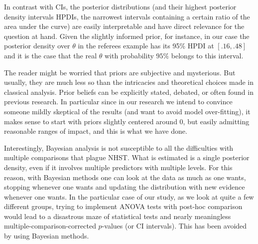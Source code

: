 In contrast with CIs, the posterior distributions (and their highest posterior density intervals HPDIs, the narrowest intervals containing a certain ratio of the area under the curve) are easily interpretable and have direct relevance for the question at hand. Given the slightly informed prior, for instance, in our case the posterior density over $\theta$ in the referees example has its 95\% HPDI at  $[.16, .48]$ and it is the case that the real $\theta$ with probability $95\%$ belongs to this interval.





The reader might be worried that priors are subjective and mysterious. But usually, they are much less so than the intricacies and theoretical choices made in classical analysis.  Prior beliefs can be explicitly stated, debated, or often found in previous research. In particular since in our research we intend to convince someone mildly skeptical of the results (and want to avoid model  over-fitting), it makes sense to start with priors slightly centered around 0, but easily admitting reasonable ranges of impact, and this is what we have done. 

Interestingly, Bayesian analysis is not susceptible to all the difficulties with multiple comparisons that plague NHST. What is estimated is a single posterior density, even if it involves multiple predictors with multiple levels. For this reason, with Bayesian methods one can look at the data as much as one wants, stopping whenever one wants and updating the distribution with new evidence whenever one wants. In the  particular case of our study, as we look at quite a few different groups, trying to implement ANOVA tests with post-hoc comparison would lead to a disastrous maze of statistical tests and nearly meaningless multiple-comparison-corrected $p$-values (or CI intervals). This has been avoided by using Bayesian methods.
